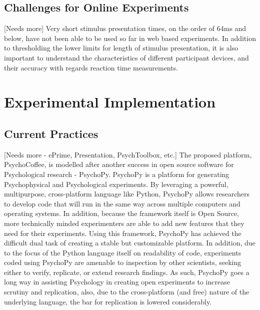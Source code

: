 \documentclass[12pt,a4paper,titlepage]{scrreprt}
\begin{document}
\subsection{Challenges for Online Experiments}
[Needs more]
Very short stimulus presentation times, on the order of 64ms and below, have not been able to be used so far in web based experiments\cite{crump_evaluating_2013}. In addition to thresholding the lower limits for length of stimulus presentation, it is also important to understand the characteristics of different participant devices, and their accuracy with regards reaction time measurements.
\section{Experimental Implementation}
\subsection{Current Practices}
[Needs more - ePrime, Presentation, PsychToolbox, etc.]
The proposed platform, PsychoCoffee, is modelled after another success in open source software for Psychological research - PsychoPy\cite{peirce_psychopypsychophysics_2007,peirce_generating_2008}. PsychoPy is a platform for generating Psychophysical and Psychological experiments. By leveraging a powerful, multipurpose, cross-platform language like Python, PsychoPy allows researchers to develop code that will run in the same way across multiple computers and operating systems. In addition, because the framework itself is Open Source, more technically minded experimenters are able to add new features that they need for their experiments. Using this framework, PsychoPy has achieved the difficult dual task of creating a stable but customizable platform. In addition, due to the focus of the Python language itself on readability of code\cite{_python_????}, experiments coded using PsychoPy are amenable to inspection by other scientists, seeking either to verify, replicate, or extend research findings. As such, PsychoPy goes a long way in assisting Psychology in creating open experiments to increase scrutiny and replication, also, due to the cross-platform (and free) nature of the underlying language, the bar for replication is lowered considerably.
\end{document}
